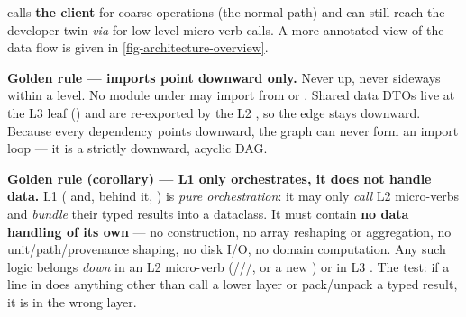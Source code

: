  calls \textbf{the client} for coarse operations (the normal path) and can still reach the developer twin \textit{via}  for low-level micro-verb calls. A more annotated view of the data flow is given in \cref{fig-architecture-overview}.

\textbf{Golden rule --- imports point downward only.} Never up, never sideways within a level. No module under  may import from  or . Shared data DTOs live at the L3 leaf () and are re-exported by the L2 , so the edge stays downward. Because every dependency points downward, the graph can never form an import loop --- it is a strictly downward, acyclic DAG.

\textbf{Golden rule (corollary) --- L1 only orchestrates, it does not handle data.} L1 ( and, behind it, ) is \emph{pure orchestration}: it may only \emph{call} L2 micro-verbs and \emph{bundle} their typed results into a  dataclass. It must contain \textbf{no data handling of its own} --- no  construction, no array reshaping or aggregation, no unit/path/provenance shaping, no disk I/O, no domain computation. Any such logic belongs \emph{down} in an L2 micro-verb (///, or a new ) or in L3 . The test: if a line in  does anything other than call a lower layer or pack/unpack a typed result, it is in the wrong layer.


